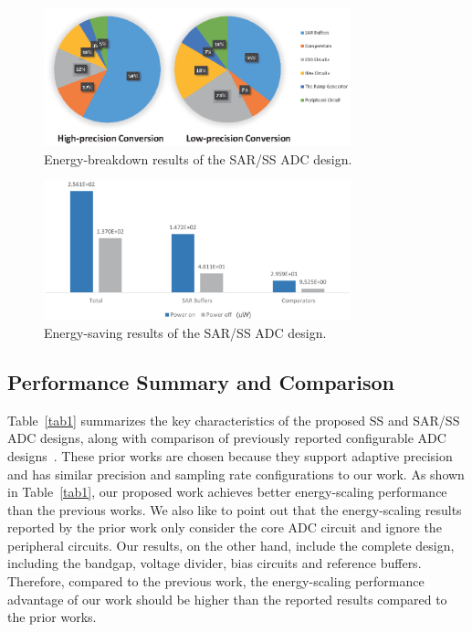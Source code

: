 \begin{figure}[htbp]
	\centerline{\includegraphics[width=3.5in]{./Figures/SARResults1.eps}}
	\caption{Energy-breakdown results of the SAR/SS ADC design.}
	\label{SARresults1}
\end{figure} 

\begin{figure}[htbp]
	\centerline{\includegraphics[width=3.5in]{./Figures/SARResults2.eps}}
	\caption{Energy-saving results of the SAR/SS ADC design.}
	\label{SARresults2}
\end{figure} 

\subsection{Performance Summary and Comparison}\label{summary}

Table~\ref{tab1} summarizes the key characteristics of the proposed SS and SAR/SS ADC designs,
along with comparison of previously reported configurable ADC designs~\cite{zhu_06_2013,yip_resolution-reconfigurable_2013}. 
These prior works are chosen because they support adaptive precision and has similar precision 
and sampling rate configurations to our work. As shown in Table~\ref{tab1}, our proposed work 
achieves better energy-scaling performance than the previous works. We also like to point out that
the energy-scaling results reported by the prior work only consider the core ADC circuit
and ignore the peripheral circuits. Our results, on the other hand, include the complete 
design, including the bandgap, voltage divider, bias circuits and reference buffers. Therefore, 
compared to the previous work, the energy-scaling performance advantage of our work should
be higher than the reported results compared to the prior works. 

